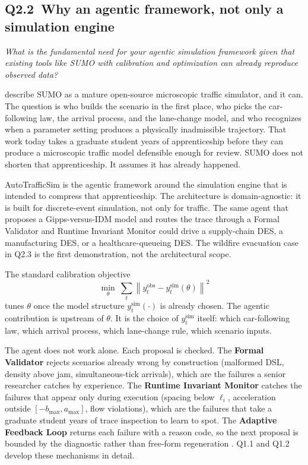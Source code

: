 \begin{bibunit}[plainnat]
\subsection{Q2.2\ Why an agentic framework, not only a simulation engine}

\textit{What is the fundamental need for your agentic simulation framework given that existing tools like SUMO with calibration and optimization can already reproduce observed data?}

\citet{lopez2018sumo} describe SUMO as a mature open-source microscopic
traffic simulator, and it can. The question is who builds the scenario
in the first place, who picks the car-following law, the arrival process,
and the lane-change model, and who recognizes when a parameter setting
produces a physically inadmissible trajectory. That work today takes a
graduate student years of apprenticeship before they can produce a
microscopic traffic model defensible enough for review. SUMO does not
shorten that apprenticeship. It assumes it has already happened.

AutoTrafficSim is the agentic framework around the simulation engine
that is intended to compress that apprenticeship. The architecture is
domain-agnostic: it is built for discrete-event simulation, not only for
traffic. The same agent that proposes a Gipps-versus-IDM model and
routes the trace through a Formal Validator and Runtime Invariant
Monitor could drive a supply-chain DES, a manufacturing DES, or a
healthcare-queueing DES. The wildfire evacuation case in Q2.3 is the
first demonstration, not the architectural scope.

The standard calibration objective
\[
  \min_{\theta}\ \sum_t
  \left\|y_t^{\mathrm{obs}} - y_t^{\mathrm{sim}}(\theta)\right\|^2
\]
tunes $\theta$ once the model structure $y_t^{\mathrm{sim}}(\cdot)$ is
already chosen. The agentic contribution is upstream of $\theta$. It is
the choice of $y_t^{\mathrm{sim}}$ itself: which car-following law,
which arrival process, which lane-change rule, which scenario inputs.

The agent does not work alone. Each proposal is checked. The
\textbf{Formal Validator} rejects scenarios already wrong by
construction (malformed DSL, density above jam, simultaneous-tick
arrivals), which are the failures a senior researcher catches by
experience. The \textbf{Runtime Invariant Monitor} catches the failures
that appear only during execution (spacing below $\ell_i$, acceleration
outside $[-b_{\max}, a_{\max}]$, flow violations), which are the
failures that take a graduate student years of trace inspection to learn
to spot. The \textbf{Adaptive Feedback Loop} returns each failure with a
reason code, so the next proposal is bounded by the diagnostic rather
than free-form regeneration \citep{yan2025guiding}. Q1.1 and Q1.2
develop these mechanisms in detail.


\end{bibunit}
